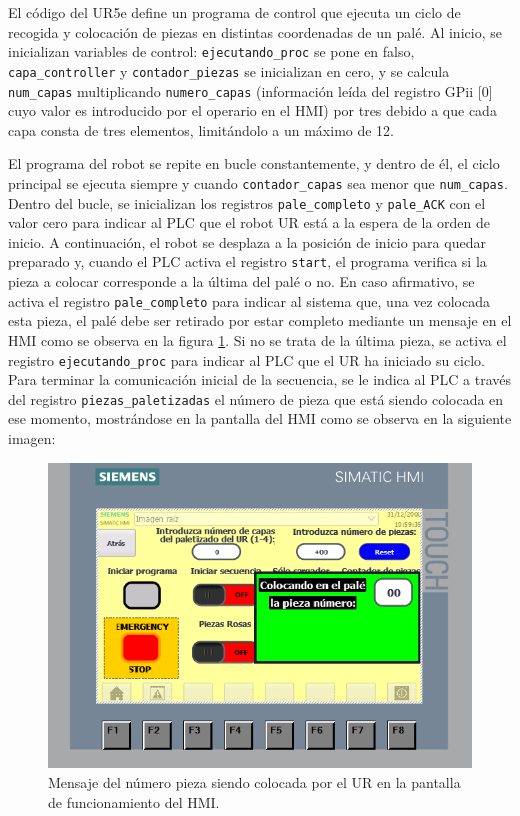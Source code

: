 \FloatBarrier

El código del UR5e define un programa de control que ejecuta un ciclo de recogida y colocación de piezas en distintas coordenadas de un palé. Al inicio, se inicializan variables de control: \texttt{ejecutando\_proc} se pone en falso, \texttt{capa\_controller} y \texttt{contador\_piezas} se inicializan en cero, y se calcula \texttt{num\_capas} multiplicando \texttt{numero\_capas} (información leída del registro GPii [0] cuyo valor es introducido por el operario en el HMI) por tres debido a que cada capa consta de tres elementos, limitándolo a un máximo de 12.

El programa del robot se repite en bucle constantemente, y dentro de él, el ciclo principal se ejecuta siempre y cuando \texttt{contador\_capas} sea menor que \texttt{num\_capas}. Dentro del bucle, se inicializan los registros \texttt{pale\_completo} y \texttt{pale\_ACK} con el valor cero para indicar al PLC que el robot UR está a la espera de la orden de inicio. A continuación, el robot se desplaza a la posición de inicio para quedar preparado y, cuando el PLC activa el registro \texttt{start}, el programa verifica si la pieza a colocar corresponde a la última del palé o no. En caso afirmativo, se activa el registro \texttt{pale\_completo} para indicar al sistema que, una vez colocada esta pieza, el palé debe ser retirado por estar completo mediante un mensaje en el HMI como se observa en la figura \ref{fig:HMI_funcionamiento_UR}. Si no se trata de la última pieza, se activa el registro \texttt{ejecutando\_proc} para indicar al PLC que el UR ha iniciado su ciclo. Para terminar la comunicación inicial de la secuencia, se le indica al PLC a través del registro \texttt{piezas\_paletizadas} el número de pieza que está siendo colocada en ese momento, mostrándose en la pantalla del HMI como se observa en la siguiente imagen:

\begin{figure}[h!]
  \begin{center}
  	\includegraphics[width=15cm]{figs/HMI_funcionamiento_UR}
  \end{center}
  \caption{\centering Mensaje del número pieza siendo colocada por el UR en la pantalla de funcionamiento del HMI.}
  \label{fig:HMI_funcionamiento_UR}
\end{figure}

